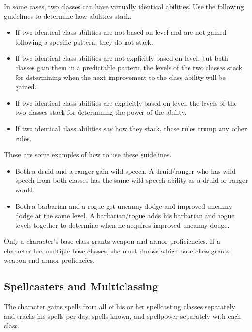         \par In some cases, two classes can have virtually identical abilities.
        Use the following guidelines to determine how abilities stack.
        \begin{itemize}
            \item If two identical class abilities are not based on level and are not gained following a specific pattern, they do not stack.
            \item If two identical class abilities are not explicitly based on level, but both classes gain them in a predictable pattern, the levels of the two classes stack for determining when the next improvement to the class ability will be gained.
            \item If two identical class abilities are explicitly based on level, the levels of the two classes stack for determining the power of the ability.
            \item If two identical class abilities say how they stack, those rules trump any other rules.
        \end{itemize}
        These are some examples of how to use these guidelines.
        \begin{itemize}
            \item Both a druid and a ranger gain wild speech.
                A druid/ranger who has wild speech from both classes has the same wild speech ability as a druid or ranger would.
            \item Both a barbarian and a rogue get uncanny dodge and improved uncanny dodge at the same level.
                A barbarian/rogue adds his barbarian and rogue levels together to determine when he acquires improved uncanny dodge.
        \end{itemize}

        Only a character's base class grants weapon and armor proficiencies.
        If a character has multiple base classes, she must choose which base class grants weapon and armor profiencies.

    \subsection{Spellcasters and Multiclassing}\label{Spellcasters and Multiclassing}
        The character gains spells from all of his or her spellcasting classes separately and tracks his spells per day, spells known, and spellpower separately with each class.


